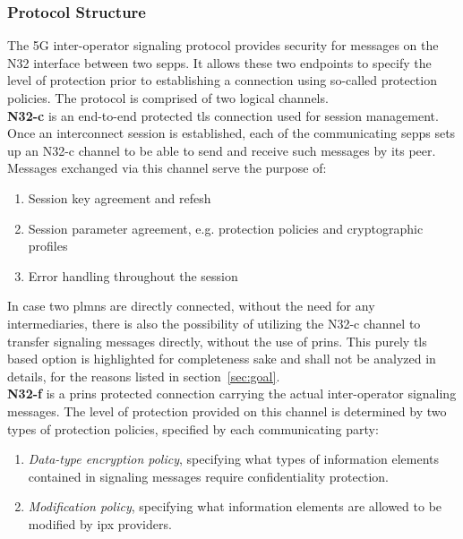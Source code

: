 \subsubsection{Protocol Structure}

The 5G inter-operator signaling protocol provides security for messages on the N32 interface between two \glspl{sepp}.
It allows these two endpoints to specify the level of protection prior to establishing a connection using so-called protection policies.
The protocol is comprised of two logical channels.
\\

\textbf{N32-c} is an end-to-end protected \gls{tls} connection used for session management.
Once an interconnect session is established, each of the communicating \glspl{sepp} sets up an N32-c channel to be able to send and receive such messages by its peer.
Messages exchanged via this channel serve the purpose of:

\begin{enumerate}[label=--]
    \item Session key agreement and refesh
    \item Session parameter agreement, e.g. protection policies and cryptographic profiles
    \item Error handling throughout the session
\end{enumerate}

In case two \glspl{plmn} are directly connected, without the need for any intermediaries, there is also the possibility of utilizing the N32-c channel to transfer signaling messages directly, without the use of \gls{prins}.
This purely \gls{tls} based option is highlighted for completeness sake and shall not be analyzed in details, for the reasons listed in section~\ref{sec:goal}.
\\

\textbf{N32-f} is a \gls{prins} protected connection carrying the actual inter-operator signaling messages.
The level of protection provided on this channel is determined by two types of protection policies, specified by each communicating party:

\begin{enumerate}[label=--]
    \item \textit{Data-type encryption policy}, specifying what types of information elements contained in signaling messages require confidentiality protection.
    \item \textit{Modification policy}, specifying what information elements are allowed to be modified by \gls{ipx} providers.
\end{enumerate}

